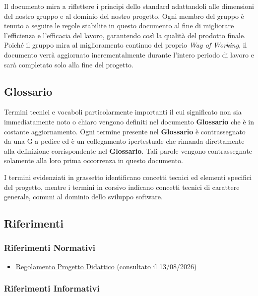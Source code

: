 \documentclass[12pt, a4paper]{article}
\begin{document}
Il documento mira a riflettere i principi dello standard adattandoli
alle dimensioni del nostro gruppo e al dominio del nostro progetto. Ogni membro del gruppo è tenuto a seguire le regole stabilite in questo
documento al fine di migliorare l'efficienza e l'efficacia del lavoro,
garantendo così la qualità del prodotto finale. Poiché il gruppo mira al miglioramento continuo del proprio \textit{Way of Working}, il documento verrà aggiornato incrementalmente durante l'intero periodo di lavoro e sarà completato solo alla fine del progetto.

\subsection{Glossario}

Termini tecnici e vocaboli particolarmente importanti il cui
significato non sia immediatamente noto o chiaro vengono definiti nel
documento \textbf{Glossario} che è in costante aggiornamento. Ogni termine
presente nel \textbf{Glossario} è contrassegnato da una G a pedice ed è un
collegamento ipertestuale che rimanda direttamente alla definizione
corrispondente nel \textbf{Glossario}. Tali parole vengono contrassegnate
solamente alla loro prima occorrenza in questo documento.

I termini evidenziati in grassetto identificano concetti tecnici ed elementi specifici del progetto, mentre i termini in corsivo indicano concetti tecnici di carattere generale, comuni al dominio dello sviluppo software.

\newpage
\subsection{Riferimenti}

\subsubsection{Riferimenti Normativi}

\begin{itemize}
\item
  \href{https://www.math.unipd.it/~tullio/IS-1/2025/Dispense/PD1.pdf}{Regolamento Progetto Didattico} (consultato il 13/08/2026)
\end{itemize}

\subsubsection{Riferimenti Informativi}
\end{document}
